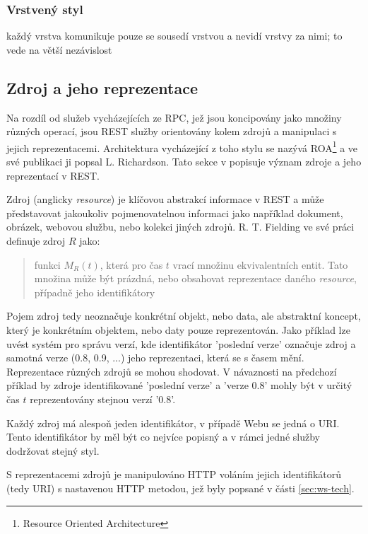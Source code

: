 \documentclass[czech,DP]{thesiskiv}
\begin{document}
\subsubsection{Vrstvený styl}
každý vrstva komunikuje pouze se sousedí vrstvou a nevidí vrstvy za nimi; to vede na větší nezávislost

\subsection{Zdroj a jeho reprezentace}
\label{sec:rest-basics}

Na rozdíl od služeb vycházejících ze RPC, jež jsou koncipovány jako množiny různých operací, jsou REST služby orientovány kolem zdrojů a manipulaci s jejich reprezentacemi. Architektura vycházející z toho stylu se nazývá ROA\footnote{Resource Oriented Architecture} a ve své publikaci\cite{restfulWebServices} ji popsal L. Richardson. Tato sekce v popisuje význam zdroje a jeho reprezentací v REST.

Zdroj (anglicky \textit{resource}) je klíčovou abstrakcí informace v REST a může představovat jakoukoliv pojmenovatelnou informaci jako například dokument, obrázek, webovou službu, nebo  kolekci jiných zdrojů. R. T. Fielding ve své práci\cite{fielding2000rest} definuje zdroj $R$ jako: 

\begin{quote}
	funkci $M_R(t)$, která pro čas $t$ vrací množinu ekvivalentních entit. Tato množina může být prázdná, nebo obsahovat reprezentace daného \textit{resource}, případně jeho identifikátory
\end{quote}

Pojem zdroj tedy neoznačuje konkrétní objekt, nebo data, ale abstraktní koncept, který je konkrétním objektem, nebo daty pouze reprezentován. Jako příklad lze uvést systém pro správu verzí, kde identifikátor 'poslední verze' označuje zdroj a samotná verze (0.8, 0.9, ...) jeho reprezentaci, která se s časem mění. Reprezentace různých zdrojů se mohou shodovat. V návaznosti na předchozí příklad by zdroje identifikované 'poslední verze' a 'verze 0.8' mohly být v určitý čas $t$ reprezentovány stejnou verzí '0.8'. 

Každý zdroj má alespoň jeden identifikátor, v případě Webu se jedná o URI. Tento identifikátor by měl být co nejvíce popisný a v rámci jedné služby dodržovat stejný styl\cite{restfulWebServices}. 

S reprezentacemi zdrojů je manipulováno HTTP voláním jejich identifikátorů (tedy URI) s nastavenou HTTP metodou, jež byly popsané v části \ref{sec:ws-tech}.
\end{document}
